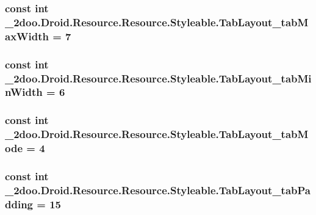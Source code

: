 \hypertarget{class__2doo_1_1_droid_1_1_resource_1_1_styleable_7bd7b59d75ebf922ea72a44950ee6351}{
\subsubsection[{TabLayout\_\-tabMaxWidth}]{\setlength{\rightskip}{0pt plus 5cm}const int \_\-2doo.Droid.Resource.Resource.Styleable.TabLayout\_\-tabMaxWidth = 7}}
\label{class__2doo_1_1_droid_1_1_resource_1_1_styleable_7bd7b59d75ebf922ea72a44950ee6351}


\hypertarget{class__2doo_1_1_droid_1_1_resource_1_1_styleable_706c1a824b7f1594171dbecc52225e86}{
\subsubsection[{TabLayout\_\-tabMinWidth}]{\setlength{\rightskip}{0pt plus 5cm}const int \_\-2doo.Droid.Resource.Resource.Styleable.TabLayout\_\-tabMinWidth = 6}}
\label{class__2doo_1_1_droid_1_1_resource_1_1_styleable_706c1a824b7f1594171dbecc52225e86}


\hypertarget{class__2doo_1_1_droid_1_1_resource_1_1_styleable_0db6caaca18c2ec46a01073bc9f4d952}{
\subsubsection[{TabLayout\_\-tabMode}]{\setlength{\rightskip}{0pt plus 5cm}const int \_\-2doo.Droid.Resource.Resource.Styleable.TabLayout\_\-tabMode = 4}}
\label{class__2doo_1_1_droid_1_1_resource_1_1_styleable_0db6caaca18c2ec46a01073bc9f4d952}


\hypertarget{class__2doo_1_1_droid_1_1_resource_1_1_styleable_06feff23c0952051d3b6d1f8534a93d1}{
\subsubsection[{TabLayout\_\-tabPadding}]{\setlength{\rightskip}{0pt plus 5cm}const int \_\-2doo.Droid.Resource.Resource.Styleable.TabLayout\_\-tabPadding = 15}}
\label{class__2doo_1_1_droid_1_1_resource_1_1_styleable_06feff23c0952051d3b6d1f8534a93d1}


